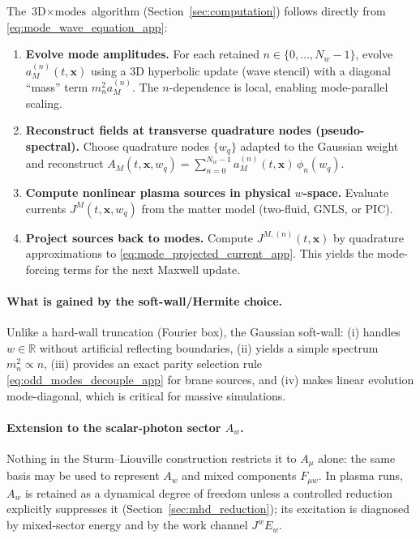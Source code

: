 \documentclass[11pt]{article}
\begin{document}
The \(\text{3D}\times\text{modes}\) algorithm (Section~\ref{sec:computation}) follows directly
from \eqref{eq:mode_wave_equation_app}:

\begin{enumerate}[leftmargin=1.6em]
\item \textbf{Evolve mode amplitudes.}
For each retained \(n\in\{0,\ldots,N_w-1\}\), evolve \(a_M^{(n)}(t,\mathbf{x})\) using a
\(3\)D hyperbolic update (wave stencil) with a diagonal ``mass'' term \(m_n^2 a_M^{(n)}\).
The \(n\)-dependence is local, enabling mode-parallel scaling.

\item \textbf{Reconstruct fields at transverse quadrature nodes (pseudo-spectral).}
Choose quadrature nodes \(\{w_q\}\) adapted to the Gaussian weight and reconstruct
\(A_M(t,\mathbf{x},w_q)=\sum_{n=0}^{N_w-1}a_M^{(n)}(t,\mathbf{x})\,\phi_n(w_q)\).

\item \textbf{Compute nonlinear plasma sources in physical \(w\)-space.}
Evaluate currents \(J^M(t,\mathbf{x},w_q)\) from the matter model (two-fluid, GNLS, or PIC).

\item \textbf{Project sources back to modes.}
Compute \(J^{M,(n)}(t,\mathbf{x})\) by quadrature approximations to
\eqref{eq:mode_projected_current_app}. This yields the mode-forcing terms for the next
Maxwell update.

\end{enumerate}

\paragraph{What is gained by the soft-wall/Hermite choice.}
Unlike a hard-wall truncation (Fourier box), the Gaussian soft-wall:
(i) handles \(w\in\mathbb{R}\) without artificial reflecting boundaries,
(ii) yields a simple spectrum \(m_n^2\propto n\),
(iii) provides an exact parity selection rule \eqref{eq:odd_modes_decouple_app} for brane sources,
and (iv) makes linear evolution mode-diagonal, which is critical for massive simulations.

\paragraph{Extension to the scalar-photon sector \(A_w\).}
Nothing in the Sturm--Liouville construction restricts it to \(A_\mu\) alone:
the same basis may be used to represent \(A_w\) and mixed components \(F_{\mu w}\).
In plasma runs, \(A_w\) is retained as a dynamical degree of freedom unless a controlled
reduction explicitly suppresses it (Section~\ref{sec:mhd_reduction}); its excitation is
diagnosed by mixed-sector energy and by the work channel \(J^wE_w\).
\end{document}
